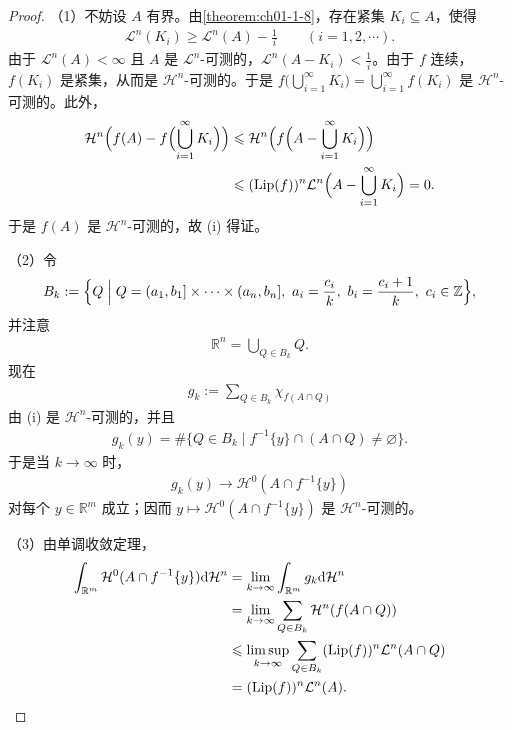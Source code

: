 \documentclass[../../main.tex]{subfiles}%
\begin{document}
\begin{proof}
（1）不妨设 $A$ 有界。由\cref{theorem:ch01-1-8}，存在紧集 $K_i\subseteq A$，使得%
\begin{align*}
\mathcal{L}^n(K_i)\geqslant\mathcal{L}^n(A)-\frac1i\qquad(i=1,2,\cdots).
\end{align*}
由于 $\mathcal{L}^n(A)<\infty$ 且 $A$ 是 $\mathcal{L}^n$-可测的，$\mathcal{L}^n(A-K_i)<\frac1i$。由于 $f$ 连续，$f(K_i)$ 是紧集，从而是 $\mathcal{H}^n$-可测的。于是 $f\bigl(\bigcup_{i=1}^{\infty}K_i\bigr)=\bigcup_{i=1}^{\infty}f(K_i)$ 是 $\mathcal{H}^n$-可测的。此外，
\begin{align*}
\mathcal{H}^n\Bigl(f(A)-f\Bigl(\bigcup_{i=1}^{\infty}K_i\Bigr)\Bigr)
&\leqslant\mathcal{H}^n\Bigl(f\Bigl(A-\bigcup_{i=1}^{\infty}K_i\Bigr)\Bigr)\\
&\leqslant(\operatorname{Lip}(f))^n\mathcal{L}^n\Bigl(A-\bigcup_{i=1}^{\infty}K_i\Bigr)=0 .
\end{align*}
于是 $f(A)$ 是 $\mathcal{H}^n$-可测的，故 (i) 得证。

（2）令
\begin{align*}
B_k:=\Bigl\{Q\Bigm|Q=(a_1,b_1]\times\cdots\times(a_n,b_n],\ a_i=\frac{c_i}{k},\ b_i=\frac{c_i+1}{k},\ c_i\in\mathbb{Z}\Bigr\},
\end{align*}
并注意
\begin{align*}
\mathbb{R}^n=\bigcup_{Q\in B_k}Q .
\end{align*}
现在
\begin{align*}
g_k:=\sum_{Q\in B_k}\chi_{f(A\cap Q)}
\end{align*}
由 (i) 是 $\mathcal{H}^n$-可测的，并且
\begin{align*}
g_k(y)=\#\{Q\in B_k\mid f^{-1}\{y\}\cap(A\cap Q)\neq\varnothing\}.
\end{align*}
于是当 $k\to\infty$ 时，
\begin{align*}
g_k(y)\to\mathcal{H}^0(A\cap f^{-1}\{y\})
\end{align*}
对每个 $y\in\mathbb{R}^m$ 成立；因而 $y\mapsto\mathcal{H}^0(A\cap f^{-1}\{y\})$ 是 $\mathcal{H}^n$-可测的。

（3）由单调收敛定理，
\begin{align*}
\int_{\mathbb{R}^m}\mathcal{H}^0(A\cap f^{-1}\{y\})\mathrm{d}\mathcal{H}^n
&=\lim_{k\to\infty}\int_{\mathbb{R}^m}g_k\mathrm{d}\mathcal{H}^n\\
&=\lim_{k\to\infty}\sum_{Q\in B_k}\mathcal{H}^n(f(A\cap Q))\\
&\leqslant\limsup_{k\to\infty}\sum_{Q\in B_k}(\operatorname{Lip}(f))^n\mathcal{L}^n(A\cap Q)\\
&=(\operatorname{Lip}(f))^n\mathcal{L}^n(A).
\end{align*}
\end{proof}
\end{document}
